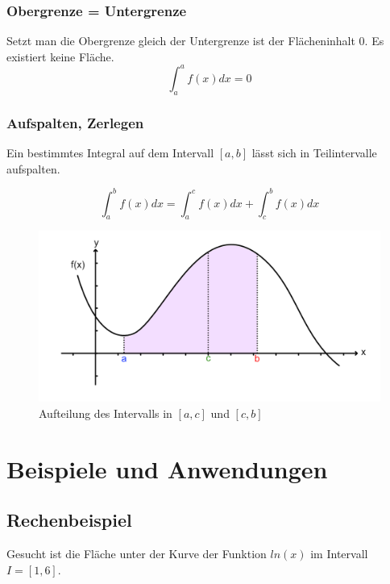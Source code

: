 \documentclass{fhnwreport} %
\begin{document}
\subsubsection{Obergrenze = Untergrenze}
Setzt man die Obergrenze gleich der Untergrenze ist der Flächeninhalt 0. Es existiert keine Fläche\cite{Portmann2019}.
\[
	\int_a^a f(x) dx = 0
\]

\subsubsection{Aufspalten, Zerlegen}
Ein bestimmtes Integral auf dem Intervall $[a,b]$ lässt sich in Teilintervalle aufspalten\cite{Portmann2019}.

\[
	\int_a^b f(x) dx = \int_a^c f(x) dx + \int_c^b f(x) dx 
\]

\begin{figure}[!h]
\centering
\includegraphics{intervall-teilen}
\caption{Aufteilung des Intervalls in $[a,c]$ und $[c,b]$}
\label{fig:intervall_teilen}
\end{figure}


\clearpage

\section{Beispiele und Anwendungen}
\subsection{Rechenbeispiel}
Gesucht ist die Fläche unter der Kurve der Funktion $ln(x)$ im Intervall $I=[1,6]$.
\end{document}
